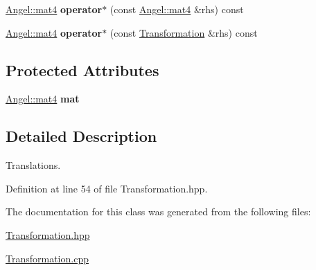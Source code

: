 \begin{DoxyCompactItemize}
\item 
\hypertarget{class_transformation_afdfbf48815a5b0d885f3b93f04cd2c66}{\hyperlink{class_angel_1_1mat4}{Angel\-::mat4} {\bfseries operator$\ast$} (const \hyperlink{class_angel_1_1mat4}{Angel\-::mat4} \&rhs) const }\label{class_transformation_afdfbf48815a5b0d885f3b93f04cd2c66}

\item 
\hypertarget{class_transformation_a85b923e0066365ef2e4aec3671396410}{\hyperlink{class_angel_1_1mat4}{Angel\-::mat4} {\bfseries operator$\ast$} (const \hyperlink{class_transformation}{Transformation} \&rhs) const }\label{class_transformation_a85b923e0066365ef2e4aec3671396410}

\end{DoxyCompactItemize}
\subsection*{Protected Attributes}
\begin{DoxyCompactItemize}
\item 
\hypertarget{class_transformation_a5f39fb578a1cdf78ca85efbd932d3834}{\hyperlink{class_angel_1_1mat4}{Angel\-::mat4} {\bfseries mat}}\label{class_transformation_a5f39fb578a1cdf78ca85efbd932d3834}

\end{DoxyCompactItemize}


\subsection{Detailed Description}
Translations. 

Definition at line 54 of file Transformation.\-hpp.



The documentation for this class was generated from the following files\-:\begin{DoxyCompactItemize}
\item 
\hyperlink{_transformation_8hpp}{Transformation.\-hpp}\item 
\hyperlink{_transformation_8cpp}{Transformation.\-cpp}\end{DoxyCompactItemize}
